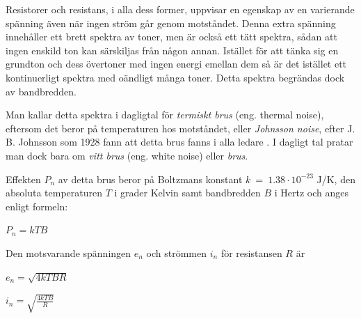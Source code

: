 \begin{rev-nytt}[MAD]
Resistorer och resistans, i alla dess former, uppvisar en egenskap av
en varierande spänning även när ingen ström går genom motståndet. Denna extra
spänning innehåller ett brett spektra av toner, men är också ett tätt spektra,
sådan att ingen enskild ton kan särskiljas från någon annan. Istället för att
tänka sig en grundton och dess övertoner med ingen energi emellan dem så är det
istället ett kontinuerligt spektra med oändligt många toner. Detta spektra
begrändas dock av bandbredden.




Man kallar detta spektra i dagligtal för \emph{termiskt brus}
(eng. thermal noise), eftersom det beror på temperaturen hos motståndet, eller
\emph{Johnsson noise}, efter J. B. Johnsson som 1928 fann att detta brus fanns
i alla ledare \cite{ott1988}.
I dagligt tal pratar man dock bara om \emph{vitt brus} (eng. white noise) eller
\emph{brus}.

Effekten \(P_n\) av detta brus beror på Boltzmans konstant
\(k\ =\ 1.38 \cdot 10^{-23}\) J/K, den absoluta temperaturen \(T\) i
grader Kelvin samt bandbredden \(B\) i Hertz och anges enligt formeln:

\(P_n = k T B\)

Den motsvarande spänningen \(e_n\) och strömmen \(i_n\) för resistansen \(R\) är

\(e_n = \sqrt{4kTBR}\)

\(i_n = \sqrt{\frac{4kTB}{R}}\)

\end{rev-nytt}

